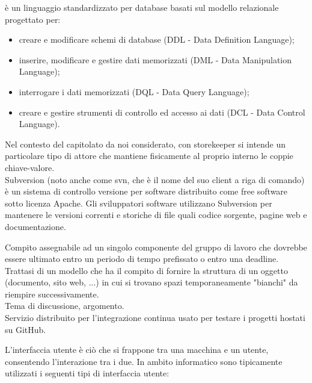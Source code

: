 \documentclass{scalatekids-article}
\begin{document}
   è un linguaggio standardizzato per database basati sul modello relazionale progettato per:
  \begin{itemize}
  	\item creare e modificare schemi di database (DDL - Data Definition Language);
  	\item inserire, modificare e gestire dati memorizzati (DML - Data Manipulation Language);
  	\item interrogare i dati memorizzati (DQL - Data Query Language);
  	\item creare e gestire strumenti di controllo ed accesso ai dati (DCL - Data Control Language).
  \end{itemize}

   Nel contesto del capitolato da noi considerato, con storekeeper si intende un particolare tipo di attore che mantiene fisicamente al proprio interno le coppie chiave-valore.
  \\

   Subversion (noto anche come svn, che è il nome del suo client a riga di comando) è un sistema di controllo versione per software distribuito come free software sotto licenza Apache.
  Gli sviluppatori software utilizzano Subversion per mantenere le versioni correnti e storiche di file quali codice sorgente, pagine web e documentazione.
  \\


  \label{sec:task} Compito assegnabile ad un singolo componente del gruppo di lavoro che dovrebbe essere ultimato entro un periodo di tempo prefissato o entro una deadline.
  \\

   Trattasi di un modello che ha il compito di fornire la struttura di un oggetto (documento, sito web, ...) in cui si trovano spazi temporaneamente "bianchi" da riempire successivamente.
  \\

   Tema di discussione, argomento.
  \\

   Servizio distribuito per l'integrazione continua usato per testare i progetti hostati su GitHub.
  \\


   L'interfaccia utente è ciò che si frappone tra una macchina e un utente, consentendo l'interazione tra i due. In ambito informatico sono tipicamente utilizzati i seguenti tipi di interfaccia utente:
\end{document}
